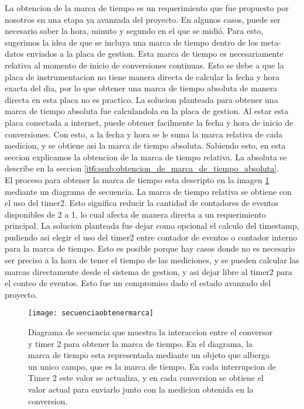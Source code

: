 La obtencion de la marca de tiempo es un requerimiento que fue propuesto por nosotros en una etapa ya avanzada del proyecto. En algunos casos, puede ser necesario saber la hora, minuto y segundo en el que se midió. Para esto, sugerimos la idea de que se incluya una marca de tiempo dentro de los meta-datos enviados a la placa de gestion. Esta marca de tiempo es necesariamente relativa al momento de inicio de conversiones continuas. Esto se debe a que la placa de instrumentacion no tiene manera directa de calcular la fecha y hora exacta del dia, por lo que obtener una marca de tiempo absoluta de manera directa en esta placa no es practico. 
La solucion planteada para obtener una marca de tiempo absoluta fue calculandola en la placa de gestion. Al estar esta placa conectada a internet, puede obtener facilmente la fecha y hora de inicio de conversiones. Con esto, a la fecha y hora se le suma la marca relativa de cada medicion, y se obtiene asi la marca de tiempo absoluta. Sabiendo esto, en esta seccion explicamos la obtencion de la marca de tiempo relativa. La absoluta se describe en la seccion \ref{it6:ssub:obtencion_de_marca_de_tiempo_absoluta}. \\

El proceso para obtener la marca de tiempo esta descripto en la imagen \ref{fig:secuenciaobtenermarca} mediante un diagrama de secuencia. La marca de tiempo relativa se obtiene con el uso del timer2. Esto significa reducir la cantidad de contadores de eventos disponibles de 2 a 1, lo cual afecta de manera directa a un requerimiento principal. La solucion planteada fue dejar como opcional el calculo del timestamp, pudiendo asi elegir el uso del timer2 entre contador de eventos o contador interno para la marca de tiempo. Esto es posible porque hay casos donde no es necesario ser preciso a la hora de tener el tiempo de las mediciones, y se pueden calcular las marcas directamente desde el sistema de gestion, y asi dejar libre al timer2 para el conteo de eventos. Esto fue un compromiso dado el estado avanzado del proyecto.


\begin{figure}[h]
  \centering
  \texttt{[image: secuenciaobtenermarca]}
  \caption[Diagrama de secuencia para la obtencion de una marca de tiempo]{Diagrama de secuencia que muestra la interaccion entre el conversor y timer 2 para obtener la marca de tiempo. En el diagrama, la marca de tiempo esta representada mediante un objeto que alberga un unico campo, que es la marca de tiempo. En cada interrupcion de Timer 2 este valor se actualiza, y en cada conversion se obtiene el valor actual para enviarlo junto con la medicion obtenida en la conversion.}\label{fig:secuenciaobtenermarca}
\end{figure}

